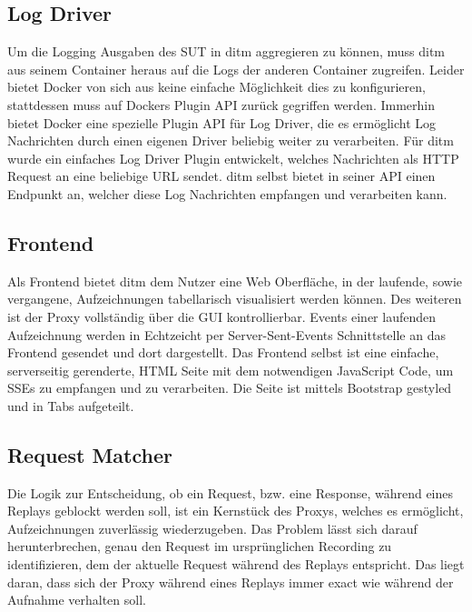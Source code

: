 \documentclass[a4paper]{report}
\begin{document}
\subsection{Log Driver}
Um die Logging Ausgaben des SUT in ditm aggregieren zu können, muss ditm aus seinem Container heraus auf die Logs der
anderen Container zugreifen. Leider bietet Docker von sich aus keine einfache Möglichkeit dies zu konfigurieren,
stattdessen muss auf Dockers Plugin API zurück gegriffen werden. Immerhin bietet Docker eine spezielle Plugin API
für Log Driver, die es ermöglicht Log Nachrichten durch einen eigenen Driver beliebig weiter zu verarbeiten.
Für ditm wurde ein einfaches Log Driver Plugin entwickelt, welches Nachrichten als HTTP Request an eine beliebige URL
sendet. ditm selbst bietet in seiner API einen Endpunkt an, welcher diese Log Nachrichten empfangen und verarbeiten kann.
\subsection{Frontend}
Als Frontend bietet ditm dem Nutzer eine Web Oberfläche, in der laufende, sowie vergangene, Aufzeichnungen
tabellarisch visualisiert werden können. Des weiteren ist der Proxy vollständig über die GUI kontrollierbar.
Events einer laufenden Aufzeichnung werden in Echtzeicht per Server-Sent-Events Schnittstelle an das Frontend
gesendet und dort dargestellt.
Das Frontend selbst ist eine einfache, serverseitig gerenderte, HTML Seite mit dem notwendigen JavaScript Code,
um SSEs zu empfangen und zu verarbeiten. Die Seite ist mittels Bootstrap gestyled und in Tabs aufgeteilt.
\subsection{Request Matcher}
Die Logik zur Entscheidung, ob ein Request, bzw. eine Response, während eines Replays geblockt werden soll,
ist ein Kernstück des Proxys, welches es ermöglicht, Aufzeichnungen zuverlässig wiederzugeben.
Das Problem lässt sich darauf herunterbrechen, genau den Request im ursprünglichen Recording zu identifizieren,
dem der aktuelle Request während des Replays entspricht. Das liegt daran, dass sich der Proxy während eines
Replays immer exact wie während der Aufnahme verhalten soll.
\end{document}
